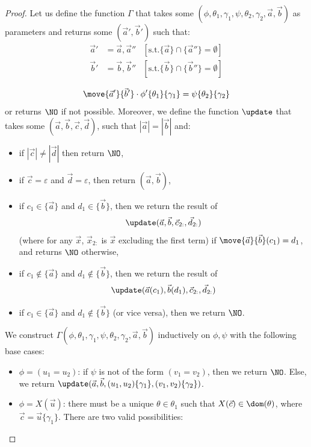 \begin{proof}
	Let us define the function $\Gamma$ that takes some $(\phi, \theta_1, \gamma_1, \psi, \theta_2, \gamma_2, \vec a, \vec b)$ as parameters and returns some $(\vec a', \vec b')$ such that:
	\[
	\begin{aligned}
		\vec a' &= \vec a, \vec a'' &[\text{s.t.} \{\vec a\} \cap \{\vec a''\} = \emptyset]\\
		\vec b' &= \vec b, \vec b'' &[\text{s.t.} \{\vec b\} \cap \{\vec b''\} = \emptyset]\\
	\end{aligned}
	\]
	\vspace{-1.5ex}
	\[
	\move{\vec a'}{\vec b'} \cdot \phi'\{\theta_1\}\{\gamma_1\} = \psi\{\theta_2\}\{\gamma_2\}
	\]
	or returns $\NO$ if not possible. 
	Moreover, we define the function $\update$ that takes some $(\vec a, \vec b, \vec c, \vec d)$, such that $|\vec a| = |\vec b|$ and:
	\begin{itemize}
		\item if $|\vec c| \neq |\vec d|$ then return $\NO$,
				\item if $\vec c = \varepsilon$ and $\vec d = \varepsilon$, then return $(\vec a, \vec b)$,
				\item if $c_1 \in \{\vec a\}$ and $d_1 \in \{\vec b\}$, then 
		we
		return the result of $$\update(\vec a, \vec b, \vec{c}_{2:}, \vec{d}_{2:})$$ (where for any $\vec x$, $\vec{x}_{2:}$ is $\vec{x}$ excluding the first term) if $\move{\vec a}{\vec b}(c_1) = d_1$, and returns $\NO$ otherwise,
				\item if $c_1 \notin \{\vec a\}$ and $d_1 \notin \{\vec b\}$, then we 
		return the result of $$\update(\vec a(c_1), \vec b(d_1), \vec{c}_{2:}, \vec{d}_{2:})$$
				\item if $c_1 \in \{\vec a\}$ and $d_1 \notin \{\vec b\}$ (or vice versa), then we return $\NO$.
	\end{itemize}
	We construct $\Gamma(\phi, \theta_1, \gamma_1, \psi, \theta_2, \gamma_2, \vec a, \vec b)$ inductively on $\phi, \psi$ with the following base cases:
	\begin{itemize}
		\item $\phi = (u_1=u_2)$: 
		if $\psi$ is not of the form $(v_1 = v_2)$, then we return $\NO$. 
		Else, we return $\update(\vec a, \vec b, (u_1,u_2)\{\gamma_1\}, (v_1,v_2)\{\gamma_2\})$.
				\item $\phi = X(\vec u)$: there must be a unique $\theta \in \theta_1$  such that $X(\vec c)\in\dom(\theta)$, where $\vec c=\vec u\{\gamma_1\}$.
		There are two valid possibilities:

\end{itemize}
\end{proof}
